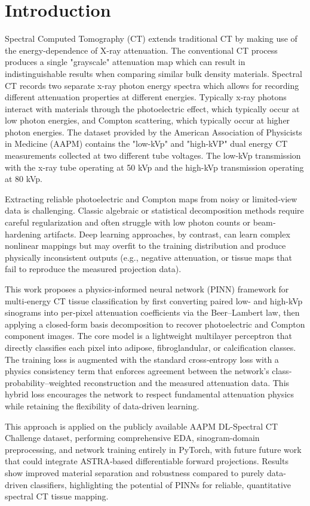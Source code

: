 \section{Introduction}\label{sec:introduction}

Spectral Computed Tomography (CT) extends traditional CT by making use of the energy-dependence of
X-ray attenuation. The conventional CT process produces a single "grayscale" attenuation map which can result in indistinguishable results when comparing similar bulk density materials. Spectral CT records
two separate x-ray photon energy spectra which allows for recording different attenuation properties
at different energies. Typically x-ray photons interact with materials through the photoelectric effect,
which typically occur at low photon energies, and Compton scattering, which typically occur at higher
photon energies. The dataset provided by the American Association of Physicists in Medicine (AAPM)
contains the "low-kVp" and "high-kVP" dual energy CT measurements collected at two different tube
voltages. The low-kVp transmission with the x-ray tube operating at 50 kVp and the high-kVp transmission operating at 80 kVp.

Extracting reliable photoelectric and Compton maps from noisy or limited‐view data is challenging. Classic algebraic or statistical decomposition methods require careful regularization and often struggle with low photon counts or beam‐hardening artifacts. Deep learning approaches, by contrast, can learn complex nonlinear mappings but may overfit to the training distribution and produce physically inconsistent outputs (e.g., negative attenuation, or tissue maps that fail to reproduce the measured projection data).

This work proposes a physics‐informed neural network (PINN) framework for multi‐energy CT tissue classification by first converting paired low- and high-kVp sinograms into per‐pixel attenuation coefficients via the Beer–Lambert law, then applying a closed-form basis decomposition to recover photoelectric and Compton component images. The core model is a lightweight multilayer perceptron that directly classifies each pixel into adipose, fibroglandular, or calcification classes. The training loss is augmented with the standard cross‐entropy loss with a physics consistency term that enforces agreement between the network’s class‐probability–weighted reconstruction and the measured attenuation data. This hybrid loss encourages the network to respect fundamental attenuation physics while retaining the flexibility of data-driven learning.

This approach is applied on the publicly available AAPM DL-Spectral CT Challenge dataset, performing comprehensive EDA, sinogram-domain preprocessing, and network training entirely in PyTorch, with future future work that could integrate ASTRA‐based differentiable forward projections. Results show improved material separation and robustness compared to purely data-driven classifiers, highlighting the potential of PINNs for reliable, quantitative spectral CT tissue mapping.

